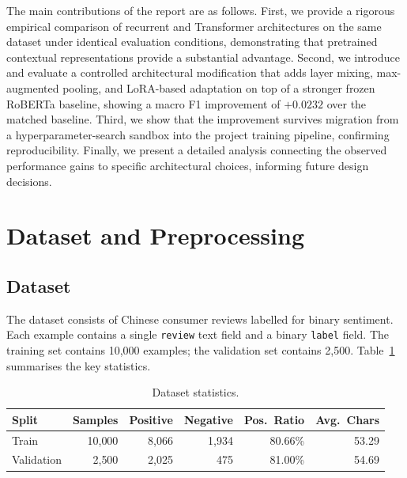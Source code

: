 \documentclass{article}
\begin{document}
The main contributions of the report are as follows.  First, we provide a
rigorous empirical comparison of recurrent and Transformer architectures on the
same dataset under identical evaluation conditions, demonstrating that
pretrained contextual representations provide a substantial advantage.  Second,
we introduce and evaluate a controlled architectural modification that adds
layer mixing, max-augmented pooling, and LoRA-based adaptation on top of a
stronger frozen RoBERTa baseline, showing a macro F1 improvement of $+0.0232$
over the matched baseline.  Third, we show that the improvement survives
migration from a hyperparameter-search sandbox into the project training
pipeline, confirming reproducibility.  Finally, we present a detailed analysis
connecting the observed performance gains to specific architectural choices,
informing future design decisions.

\section{Dataset and Preprocessing}

\subsection{Dataset}

The dataset consists of Chinese consumer reviews labelled for binary sentiment.
Each example contains a single \texttt{review} text field and a binary
\texttt{label} field.  The training set contains 10,000 examples; the
validation set contains 2,500.  Table~\ref{tab:dataset} summarises the key
statistics.

\begin{table}[h]
  \centering
  \caption{Dataset statistics.}
  \label{tab:dataset}
  \setlength{\tabcolsep}{7pt}
  \begin{tabular}{lrrrrr}
    \toprule
    Split & Samples & Positive & Negative & Pos.\ Ratio & Avg.\ Chars \\
    \midrule
    Train      & 10{,}000 & 8{,}066 & 1{,}934 & 80.66\% & 53.29 \\
    Validation &  2{,}500 & 2{,}025 &   475   & 81.00\% & 54.69 \\
    \bottomrule
  \end{tabular}
\end{table}
\end{document}
